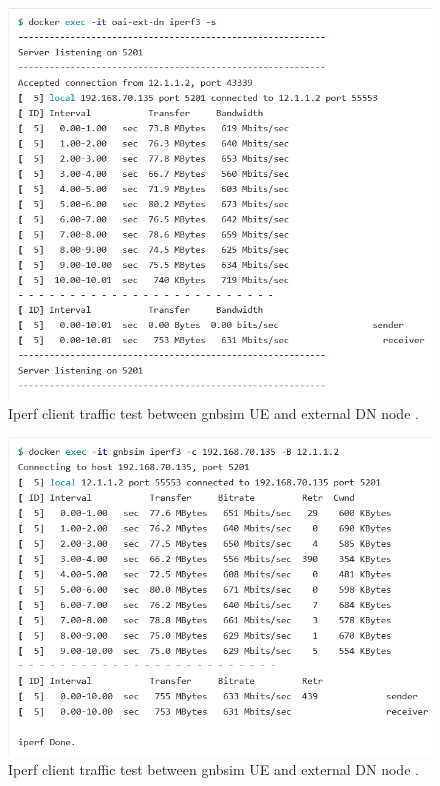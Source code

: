 \begin{figure}
\centering
\includegraphics[scale=0.50]{images/iperf_server_traffic_test_between_gnbsim_UE_and_external_DN_node.png}
\caption{Iperf client traffic test between gnbsim UE and external DN node \cite{openairinterface2014}.}
\label{fig:iperf_server_traffic_test_between_gnbsim_UE_and_external_DN_node}
\end{figure}

\begin{figure}
\centering
\includegraphics[scale=0.50]{images/iperf_client_traffic_test_between_gnbsim_UE_and_external_DN_node.png}
\caption{Iperf client traffic test between gnbsim UE and external DN node \cite{openairinterface2014}.}
\label{fig:iperf_client_traffic_test_between_gnbsim_UE_and_external_DN_node}
\end{figure}

